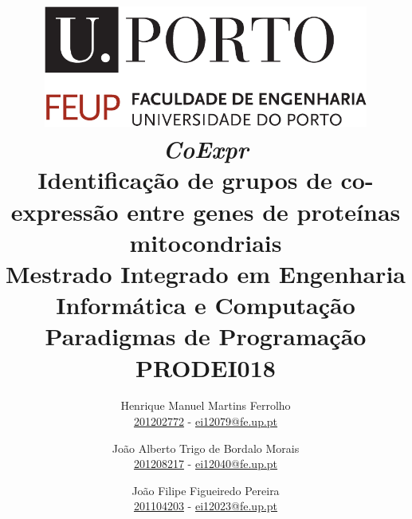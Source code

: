 \title{
    \includegraphics[width=0.8\textwidth]{res/feup-logo.pdf}\\
    \bigskip
    \bigskip
    \huge{\textbf{\textit{CoExpr}}}\\
    \bigskip
    \bigskip
    \large\textbf{Identificação de grupos de co-expressão entre genes de proteínas mitocondriais}\\
    \bigskip
    \bigskip
    \large{Mestrado Integrado em Engenharia Informática e Computação}\\
    \bigskip
    \bigskip
    \large{\textbf{Paradigmas de Programação}\\PRODEI018}\\
    \bigskip
}

\author{
    Henrique Manuel Martins Ferrolho\\
    \href{https://sigarra.up.pt/feup/pt/fest_geral.cursos_list?pv_num_unico=201202772}{201202772} - \href{mailto:ei12079@fe.up.pt}{ei12079@fe.up.pt}
    \and
    João Alberto Trigo de Bordalo Morais\\
    \href{https://sigarra.up.pt/feup/pt/fest_geral.cursos_list?pv_num_unico=201208217}{201208217} - \href{mailto:ei12040@fe.up.pt}{ei12040@fe.up.pt}
    \and
    João Filipe Figueiredo Pereira\\
    \href{https://sigarra.up.pt/feup/pt/fest_geral.cursos_list?pv_num_unico=201104203}{201104203} - \href{mailto:ei12023@fe.up.pt}{ei12023@fe.up.pt}\\
    \bigskip
}

\maketitle

\newpage
